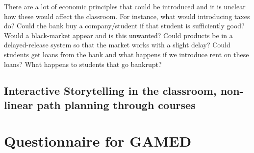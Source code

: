 \documentclass[11pt]{article}
\begin{document}
There are a lot of economic principles that could be introduced and it is unclear how these would affect the classroom. For instance, what would introducing taxes do? Could the bank buy a company/student if that student is sufficiently good? Would a black-market appear and is this unwanted? Could products be in a delayed-release system so that the market works with a slight delay? Could students get loans from the bank and what happens if we introduce rent on these loans? What happens to students that go bankrupt? 


\subsection{Interactive Storytelling in the classroom, non-linear path planning through courses}


\section{Questionnaire for GAMED}
\end{document}

